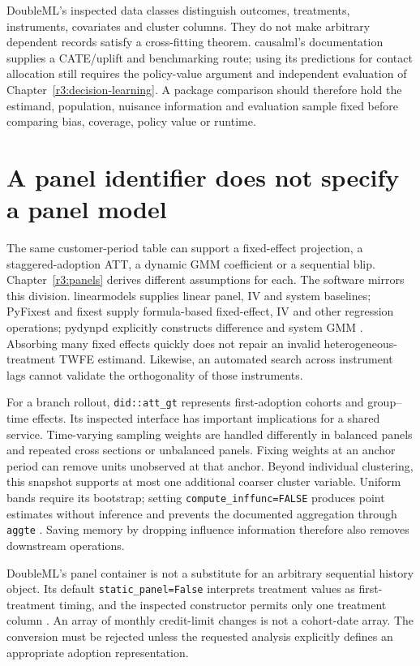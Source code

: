 DoubleML's inspected data classes distinguish outcomes, treatments,
instruments, covariates and cluster columns. They do not make arbitrary
dependent records satisfy a cross-fitting theorem. causalml's documentation
supplies a CATE/uplift and benchmarking route; using its predictions for
contact allocation still requires the policy-value argument and independent
evaluation of Chapter~\ref{r3:decision-learning}. A package comparison should
therefore hold the estimand, population, nuisance information and evaluation
sample fixed before comparing bias, coverage, policy value or runtime.

\section{A panel identifier does not specify a panel model}
\label{r3:software-panels}

The same customer-period table can support a fixed-effect projection,
a staggered-adoption ATT, a dynamic GMM coefficient or a sequential blip.
Chapter~\ref{r3:panels} derives different assumptions for each. The software
mirrors this division. linearmodels supplies linear panel, IV and system
baselines; PyFixest and fixest supply formula-based fixed-effect, IV and
other regression operations; pydynpd explicitly constructs difference and
system GMM \citep{sw_linearmodels,sw_pyfixest,sw_fixest,sw_pydynpd}.
Absorbing many fixed effects quickly does not repair an invalid
heterogeneous-treatment TWFE estimand. Likewise, an automated search across
instrument lags cannot validate the orthogonality of those instruments.

For a branch rollout, \texttt{did::att\_gt} represents first-adoption
cohorts and group--time effects. Its inspected interface has important
implications for a shared service. Time-varying sampling weights are
handled differently in balanced panels and repeated cross sections or
unbalanced panels. Fixing weights at an anchor period can remove units
unobserved at that anchor. Beyond individual clustering, this snapshot
supports at most one additional coarser cluster variable. Uniform bands
require its bootstrap; setting \texttt{compute\_inffunc=FALSE} produces
point estimates without inference and prevents the documented aggregation
through \texttt{aggte} \citep{sw_did}. Saving memory by dropping influence
information therefore also removes downstream operations.

DoubleML's panel container is not a substitute for an arbitrary sequential
history object. Its default \texttt{static\_panel=False} interprets
treatment values as first-treatment timing, and the inspected constructor
permits only one treatment column \citep{sw_doubleml}. An array of monthly
credit-limit changes is not a cohort-date array. The conversion must be
rejected unless the requested analysis explicitly defines an appropriate
adoption representation.

